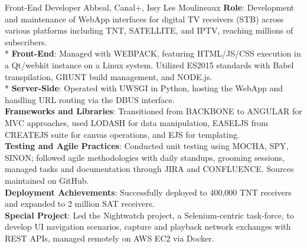 \documentclass[
  a4paper,
   maincolor=cvblue,
   sectioncolor=cvblue,
]{fortysecondscv}
\begin{document}
\begin{cvtable}
    {Front-End Developer}
    {Abbeal, Canal+, Issy Les Moulineaux}
    {
      \textbf{Role}: Development and maintenance of WebApp interfaces for digital TV receivers (STB) across various platforms including TNT, SATELLITE, and IPTV, reaching millions of subscribers.\\
      * \textbf{Front-End}: Managed with WEBPACK, featuring HTML/JS/CSS execution in a Qt/webkit instance on a Linux system. Utilized ES2015 standards with Babel transpilation, GRUNT build management, and NODE.js.\\
      * \textbf{Server-Side}: Operated with UWSGI in Python, hosting the WebApp and handling URL routing via the DBUS interface.\\
      \textbf{Frameworks and Libraries}: Transitioned from BACKBONE to ANGULAR for MVC approaches, used LODASH for data manipulation, EASELJS from CREATEJS suite for canvas operations, and EJS for templating.\\
      \textbf{Testing and Agile Practices}: Conducted unit testing using MOCHA, SPY, SINON; followed agile methodologies with daily standups, grooming sessions, managed tasks and documentation through JIRA and CONFLUENCE. Sources maintained on GitHub.\\
      \textbf{Deployment Achievements}: Successfully deployed to 400,000 TNT receivers and expanded to 2 million SAT receivers.\\
      \textbf{Special Project}: Led the Nightwatch project, a Selenium-centric task-force, to develop UI navigation scenarios, capture and playback network exchanges with REST APIs, managed remotely on AWS EC2 via Docker.\\
    }
\end{cvtable}
\end{document}
